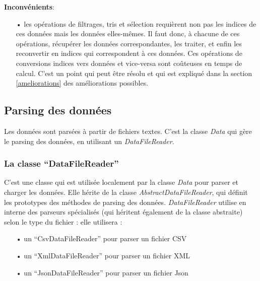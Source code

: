\documentclass[12pt]{article}
\begin{document}
		\textbf{Inconvénients}:
		\begin{itemize}
			\item[•] les opérations de filtrages, tris et sélection requièrent non pas les
			indices de ces données mais les données elles-mêmes. Il faut donc, à chacune de
			ces opérations, récupérer les données correspondantes, les traiter, et enfin
			les reconvertir en indices qui correspondent à ces données. Ces opérations
			de conversions indices vers données et vice-versa sont coûteuses en temps
			de calcul. C’est un point qui peut être résolu et qui est expliqué dans
			la section \ref{ameliorations} des améliorations possibles.
		\end{itemize}
			
		\subsection{Parsing des données}
		Les données sont parsées à partir de fichiers textes. C’est la classe \textit{Data} qui
		gère le parsing des données, en utilisant un \textit{DataFileReader}.
					
		\subsubsection{La classe “DataFileReader”}
	C’est une classe qui est utilisée localement par la classe \textit{Data} pour parser et charger les données. Elle hérite de la classe \textit{AbstractDataFileReader}, qui définit les prototypes des méthodes de parsing des données. \textit{DataFileReader} utilise en interne des parseurs spécialisés (qui héritent également de la classe abstraite) selon le type du fichier : elle utilisera :\\
	
		\begin{itemize}
			\item[•]un “CsvDataFileReader” pour parser un fichier CSV
			\item[•]un “XmlDataFileReader” pour parser un fichier XML
			\item[•]un “JsonDataFileReader” pour parser un fichier Json\\
		\end{itemize}
	
	
\end{document}
